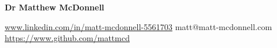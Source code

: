 \documentclass[10pt,a4paper]{article}
\begin{document}
\centerline{\textbf{Dr Matthew McDonnell}}
\footnotesize{\url{www.linkedin.com/in/matt-mcdonnell-5561703}} matt@matt-mcdonnell.com \footnotesize{\url{https://www.github.com/mattmcd}}
\\
\\
\\
\end{document}
